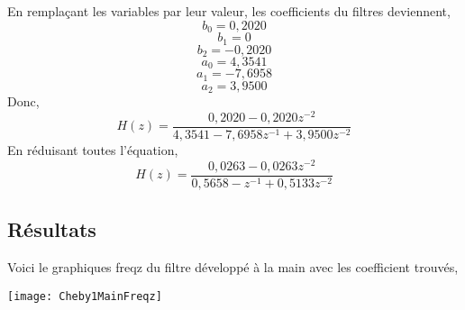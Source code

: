 \documentclass{article}
\begin{document}
En remplaçant les variables par leur valeur, les coefficients du filtres deviennent,
\begin{equation}
b_0 = 0,2020
\end{equation}
\begin{equation}
b_1 = 0
\end{equation}
\begin{equation}
b_2 = -0,2020
\end{equation}
\begin{equation}
a_0 = 4,3541
\end{equation}
\begin{equation}
a_1 = -7,6958
\end{equation}
\begin{equation}
a_2 = 3,9500
\end{equation}
Donc,
\begin{equation}
H(z) = \frac{0,2020 - 0,2020z^{-2}}{4,3541 - 7,6958z^{-1} + 3,9500z^{-2}}
\end{equation}
En réduisant toutes l'équation,
\begin{equation}
H(z) = \frac{0,0263 - 0,0263z^{-2}}{0,5658 - z^{-1} + 0,5133z^{-2}}
\end{equation}
\subsection{Résultats}
Voici le graphiques freqz du filtre développé à la main avec les coefficient trouvés,

\begin{center}
	\texttt{[image: Cheby1MainFreqz]}
\end{center}
\end{document}
